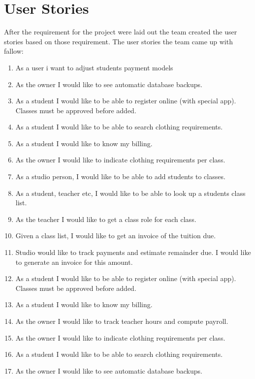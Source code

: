 \documentclass[11pt]{book}
\begin{document}
\section{User Stories}

After the requirement for the project were laid out the team created the user stories based on those requirement. The user stories the team came up with fallow:

\begin{enumerate}
  \item As a user i want to adjust students payment models
  \item As the owner I would like to see automatic database backups.
  \item As a student I would like to be able to register online (with special app). Classes must be approved before added.
  \item As a student I would like to be able to search clothing requirements.
  \item As a student I would like to know my billing.
  \item As the owner I would like to indicate clothing requirements per class.
  \item As a studio person, I would like to be able to add students to classes.
  \item  As a student, teacher etc, I would like to be able to look up a students class list.
  \item As the teacher I would like to get a class role for each class.
  \item Given a class list, I would like to get an invoice of the tuition due.
  \item Studio would like to track payments and estimate remainder due.  I would like to generate an invoice for this amount.
  \item As a student I would like to be able to register online (with special app).   Classes must be approved before added.
  \item As a student I would like to know my billing.
  \item As the owner I would like to track teacher hours and compute payroll.
  \item As the owner I would like to indicate clothing requirements per class.
  \item As a student I would like to be able to search clothing requirements.
  \item As the owner I would like to see automatic database backups.
\end{enumerate}
\end{document}
